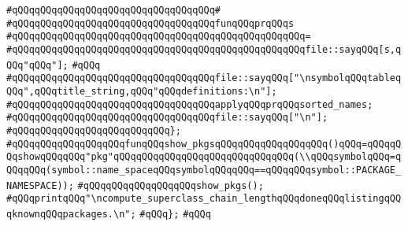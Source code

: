 \verb|#qQQqqQQqqQQqqQQqqQQqqQQqqQQqqQQqqQQq#|\newline
\verb|#qQQqqQQqqQQqqQQqqQQqqQQqqQQqqQQqqQQqfunqQQqprqQQqs|\newline
\verb|#qQQqqQQqqQQqqQQqqQQqqQQqqQQqqQQqqQQqqQQqqQQqqQQqqQQq=|\newline
\verb|#qQQqqQQqqQQqqQQqqQQqqQQqqQQqqQQqqQQqqQQqqQQqqQQqqQQqfile::sayqQQq[s,qQQq"qQQq"];|\newline
\verb|#qQQq|\newline
\verb|#qQQqqQQqqQQqqQQqqQQqqQQqqQQqqQQqqQQqfile::sayqQQq["\nsymbolqQQqtableqQQq",qQQqtitle_string,qQQq"qQQqdefinitions:\n"];|\newline
\verb|#qQQqqQQqqQQqqQQqqQQqqQQqqQQqqQQqqQQqapplyqQQqprqQQqsorted_names;|\newline
\verb|#qQQqqQQqqQQqqQQqqQQqqQQqqQQqqQQqqQQqfile::sayqQQq["\n"];|\newline
\verb|#qQQqqQQqqQQqqQQqqQQqqQQqqQQq};|\newline
\verb|#qQQqqQQqqQQqqQQqqQQqfunqQQqshow_pkgsqQQqqQQqqQQqqQQqqQQq()qQQq=qQQqqQQqshowqQQqqQQq"pkg"qQQqqQQqqQQqqQQqqQQqqQQqqQQqqQQq(\\qQQqsymbolqQQq=qQQqqQQq(symbol::name_spaceqQQqsymbolqQQqqQQq==qQQqqQQqsymbol::PACKAGE_NAMESPACE));|\newline
\verb|#qQQqqQQqqQQqqQQqqQQqshow_pkgs();|\newline
\verb|#qQQqprintqQQq"\ncompute_superclass_chain_lengthqQQqdoneqQQqlistingqQQqknownqQQqpackages.\n";|\newline
\verb|#qQQq};|\newline
\verb|#qQQq|\newline

